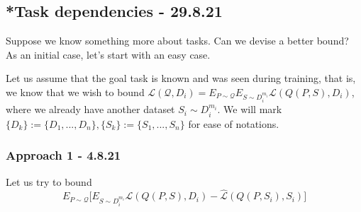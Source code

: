 \documentclass[letterpaper]{article}
\theoremstyle{definition}
\begin{document}




	

\subsection{*Task dependencies - 29.8.21} \label{sec:bayes:dependencies}

Suppose we know something more about tasks. Can we devise a better bound?
As an initial case, let's start with an easy case.

Let us assume that the goal task is known and was seen during training, that is, we know that we wish to bound $\mathcal{L}(\mathcal{Q}, D_i)=E_{P\sim \mathcal{Q}}E_{S\sim D_i^{m_i}}\mathcal{L}(Q(P, S), D_i)$, where we already have another dataset $S_i\sim D_i^{m_i}$. We will mark $\{D_k\}:=\{D_1,...,D_n\}, \{S_k\}:=\{S_1,...,S_n\}$ for ease of notations.

\subsubsection*{Approach 1 - 4.8.21}
Let us try to bound
$$E_{P\sim \mathcal{Q}}\bigl [E_{S\sim D_i^{m_i}}\mathcal{L}(Q(P, S), D_i)-\hat{\mathcal{L}}(Q(P, S_i), S_i)\bigr ]$$
\end{document}
